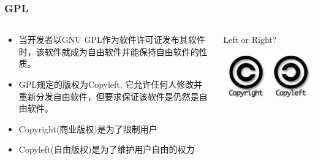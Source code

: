 \documentclass[xcolor=svgnames,presentation]{beamer}
\begin{document}
\begin{frame}
\frametitle{GPL}
\label{sec-2-2-5}
\begin{columns}
\begin{column}{0.6\textwidth}
\label{sec-2-2-5-1}
\begin{itemize}

\item 当开发者以GNU GPL作为软件许可证发布其软件时，该软件就成为自由软件并能保持自由软件的性质。
\label{sec-2-2-5-2}%

\item GPL规定的版权为Copyleft, 它允许任何人修改并重新分发自由软件，但要求保证该软件是仍然是自由软件。
\label{sec-2-2-5-3}%

\item Copyright(商业版权)是为了限制用户
\label{sec-2-2-5-4}%

\item Copyleft(自由版权)是为了维护用户自由的权力
\label{sec-2-2-5-5}%
\end{itemize} %
\end{column}
\begin{column}{0.4\textwidth}
\begin{exampleblock}{Left or Right?}
\label{sec-2-2-5-6}

\includegraphics[width=1\textwidth]{img/copy.jpg}
\end{exampleblock}
\end{column}
\end{columns}
\end{frame}
\end{document}
